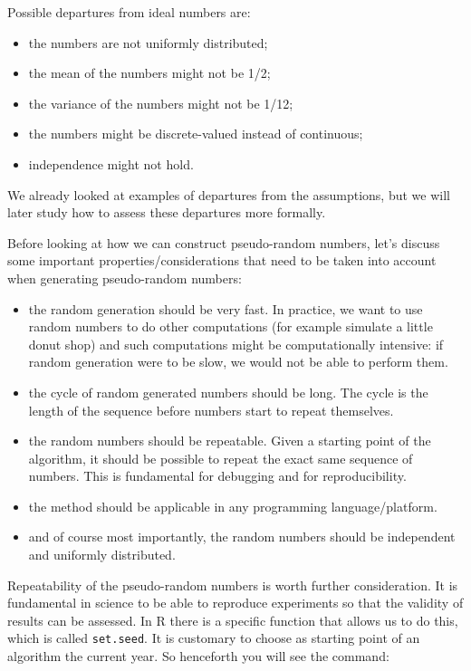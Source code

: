 \documentclass[
]{book}
\theoremstyle{definition}
\theoremstyle{definition}
\theoremstyle{definition}
\theoremstyle{definition}
\theoremstyle{remark}
\begin{document}
Possible departures from ideal numbers are:

\begin{itemize}
\item
  the numbers are not uniformly distributed;
\item
  the mean of the numbers might not be 1/2;
\item
  the variance of the numbers might not be 1/12;
\item
  the numbers might be discrete-valued instead of continuous;
\item
  independence might not hold.
\end{itemize}

We already looked at examples of departures from the assumptions, but we will later study how to assess these departures more formally.

Before looking at how we can construct pseudo-random numbers, let's discuss some important properties/considerations that need to be taken into account when generating pseudo-random numbers:

\begin{itemize}
\item
  the random generation should be very fast. In practice, we want to use random numbers to do other computations (for example simulate a little donut shop) and such computations might be computationally intensive: if random generation were to be slow, we would not be able to perform them.
\item
  the cycle of random generated numbers should be long. The cycle is the length of the sequence before numbers start to repeat themselves.
\item
  the random numbers should be repeatable. Given a starting point of the algorithm, it should be possible to repeat the exact same sequence of numbers. This is fundamental for debugging and for reproducibility.
\item
  the method should be applicable in any programming language/platform.
\item
  and of course most importantly, the random numbers should be independent and uniformly distributed.
\end{itemize}

Repeatability of the pseudo-random numbers is worth further consideration. It is fundamental in science to be able to reproduce experiments so that the validity of results can be assessed. In R there is a specific function that allows us to do this, which is called \texttt{set.seed}. It is customary to choose as starting point of an algorithm the current year. So henceforth you will see the command:
\end{document}
